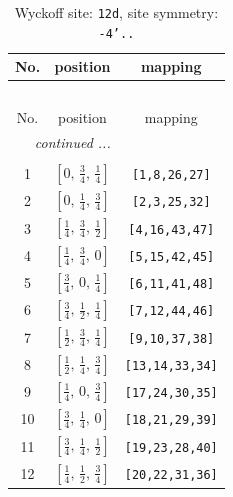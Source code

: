 \documentclass[fleqn,8pt]{jsarticle}
\begin{document}
\begin{longtable}{ccc}
\caption{Wyckoff site: {\tt 12d}, site symmetry: {\tt -4'..}}
 \\
 \hline \hline
No. & position & mapping \\ \hline \endfirsthead

\multicolumn{2}{l}{\tablename\ \thetable{}} \\
 \hline \hline
No. & position & mapping \\ \hline \endhead

 \hline \hline
\multicolumn{2}{r}{\footnotesize\it continued ...} \\ \endfoot

 \hline \hline
\multicolumn{2}{r}{} \\ \endlastfoot

1 & $\left[ 0,\, \frac{3}{4},\, \frac{1}{4} \right]$ & {\tt [1,8,26,27]} \\ \hline
2 & $\left[ 0,\, \frac{1}{4},\, \frac{3}{4} \right]$ & {\tt [2,3,25,32]} \\ \hline
3 & $\left[ \frac{1}{4},\, \frac{3}{4},\, \frac{1}{2} \right]$ & {\tt [4,16,43,47]} \\ \hline
4 & $\left[ \frac{1}{4},\, \frac{3}{4},\, 0 \right]$ & {\tt [5,15,42,45]} \\ \hline
5 & $\left[ \frac{3}{4},\, 0,\, \frac{1}{4} \right]$ & {\tt [6,11,41,48]} \\ \hline
6 & $\left[ \frac{3}{4},\, \frac{1}{2},\, \frac{1}{4} \right]$ & {\tt [7,12,44,46]} \\ \hline
7 & $\left[ \frac{1}{2},\, \frac{3}{4},\, \frac{1}{4} \right]$ & {\tt [9,10,37,38]} \\ \hline
8 & $\left[ \frac{1}{2},\, \frac{1}{4},\, \frac{3}{4} \right]$ & {\tt [13,14,33,34]} \\ \hline
9 & $\left[ \frac{1}{4},\, 0,\, \frac{3}{4} \right]$ & {\tt [17,24,30,35]} \\ \hline
10 & $\left[ \frac{3}{4},\, \frac{1}{4},\, 0 \right]$ & {\tt [18,21,29,39]} \\ \hline
11 & $\left[ \frac{3}{4},\, \frac{1}{4},\, \frac{1}{2} \right]$ & {\tt [19,23,28,40]} \\ \hline
12 & $\left[ \frac{1}{4},\, \frac{1}{2},\, \frac{3}{4} \right]$ & {\tt [20,22,31,36]} \\
\end{longtable}
\renewcommand{\arraystretch}{1.2}
\end{document}
